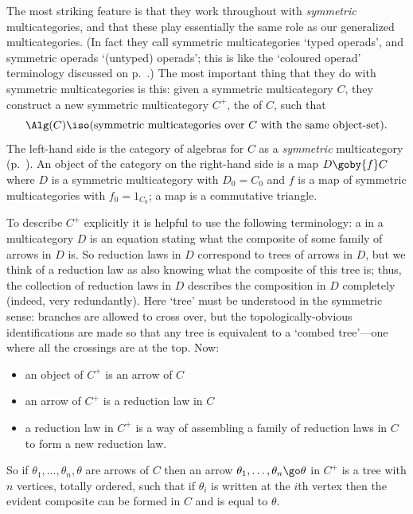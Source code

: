 The most striking feature is that they work throughout with
\emph{symmetric} multicategories, and that these play essentially the same
role as our generalized multicategories.  (In fact they call symmetric
multicategories `typed%
%
%
operads', and symmetric operads `(untyped) operads';
this is like the `coloured operad' terminology discussed on
p.~\pageref{p:col-opd}.)  The most important thing that they do with
symmetric multicategories is this: given a symmetric multicategory $C$,
they construct a new symmetric multicategory $C^+$,%
% 
% 
the %
%
%
of
$C$, such that
%
\begin{equation}	\label{eq:sym-slice}
\Alg(C) \iso 
(\textrm{symmetric multicategories over }
C
\textrm{ with the same object-set}).
\end{equation}
%
The left-hand side is the category of algebras for $C$ as a
\emph{symmetric} multicategory (p.~\pageref{p:defn-sym-alg}).  An object of
the category on the right-hand side is a map $D \goby{f} C$ where $D$ is a
symmetric multicategory with $D_0 = C_0$ and $f$ is a map of symmetric
multicategories with $f_0 = 1_{C_0}$; a map is a commutative triangle.

To describe $C^+$ explicitly it is helpful to use the following
terminology: a  in a multicategory $D$ is an equation
stating what the composite of some family of arrows in $D$ is.  So
reduction laws in $D$ correspond to trees of arrows in $D$, but we think of
a reduction law as also knowing what the composite of this tree is; thus,
the collection of reduction laws in $D$ describes the composition in $D$
completely (indeed, very redundantly).  Here `tree' must be understood in
the symmetric sense: branches are allowed to cross over, but the
topologically-obvious identifications are made so that any tree is
equivalent to a `combed%
%
%
%
tree'---one where all the crossings are at the top.
Now:
%
\begin{itemize}
\item an object of $C^+$ is an arrow of $C$
\item an arrow of $C^+$ is a reduction law in $C$
\item a reduction law in $C^+$ is a way of assembling a family of reduction
  laws in $C$ to form a new reduction law.  
\end{itemize}
%
So if $\theta_1, \ldots, \theta_n, \theta$ are arrows of $C$ then an arrow
$\theta_1, \ldots, \theta_n \go \theta$ in $C^+$ is a tree%
%
%
with $n$
vertices, totally ordered, such that if $\theta_i$ is written at the $i$th
vertex then the evident composite can be formed in $C$ and is equal to
$\theta$.  

